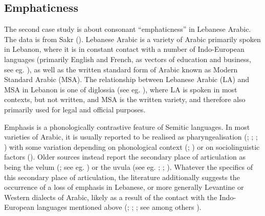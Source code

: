 \documentclass[
  man,
  longtable,
  nolmodern,
  notxfonts,
  notimes,
  colorlinks=true,linkcolor=blue,citecolor=blue,urlcolor=blue]{apa7}
\begin{document}
\subsection{Emphaticness}\label{sec-gam-emphaticness}

The second case study is about consonant ``emphaticness'' in Lebanese
Arabic. The data is from Sakr (). Lebanese
Arabic is a variety of Arabic primarily spoken in Lebanon, where it is
in constant contact with a number of Indo-European languages (primarily
English and French, as vectors of education and business, see eg.
), as well as the
written standard form of Arabic known as Modern Standard Arabic (MSA).
The relationship between Lebanese Arabic (LA) and MSA in Lebanon is one
of diglossia (see eg. ), where LA is
spoken in most contexts, but not written, and MSA is the written
variety, and therefore also primarily used for legal and official
purposes.

Emphasis is a phonologically contrastive feature of Semitic languages.
In most varieties of Arabic, it is usually reported to be realised as
pharyngealisation (;
; ; ) with some
variation depending on phonological context
(;
) or on sociolinguistic factors
(). Older sources
instead report the secondary place of articulation as being the velum
(; see eg.
) or the uvula (see eg.
;
;
). Whatever the specifics of
this secondary place of articulation, the literature additionally
suggests the occurrence of a loss of emphasis in Lebanese, or more
generally Levantine or Western dialects of Arabic, likely as a result of
the contact with the Indo-European languages mentioned above
(;
;
; see among others
).
\end{document}
